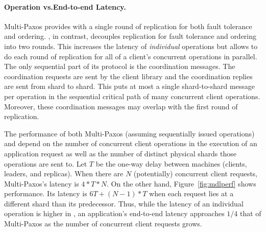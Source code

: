 \paragraph{Operation vs.\@ End-to-end Latency.}
Multi-Paxos provides \sdl{} with a single round of replication for both fault
tolerance and ordering.  \sys{}, in contrast, decouples replication for fault
tolerance and ordering into two rounds.  This increases the latency of
\textit{individual} operations but allows \sys{} to do each round of
replication for all of a client's concurrent operations in parallel. The only
sequential part of its protocol is the coordination messages.  The
coordination requests are sent by the client library and the coordination
replies are sent from shard to shard.  This puts at most a single shard-to-shard
message per operation in the sequential critical path of many concurrent client
operations. Moreover, these coordination messages may overlap with the first
round of replication.

The performance of both Multi-Paxos (assuming sequentially issued operations) and \sys{} depend on the number of concurrent client operations in the execution of an
application request as well as the number of distinct physical shards those
operations are sent to. Let $T$ be the one-way delay between machines (clients,
leaders, and replicas).  When there are $N$ (potentially) concurrent client
requests, Multi-Paxos's latency is $4*T*N$. On the other hand,
Figure~\ref{fig:mdlperf} shows \sys{} performance. Its latency
is $6T + (N-1)*T$ when each request lies at a different shard
than its predecessor.  Thus, while the latency of an individual operation is
higher in \sys{}, an application's end-to-end latency approaches
$1/4$ that of Multi-Paxos as the number of concurrent client requests grows.



